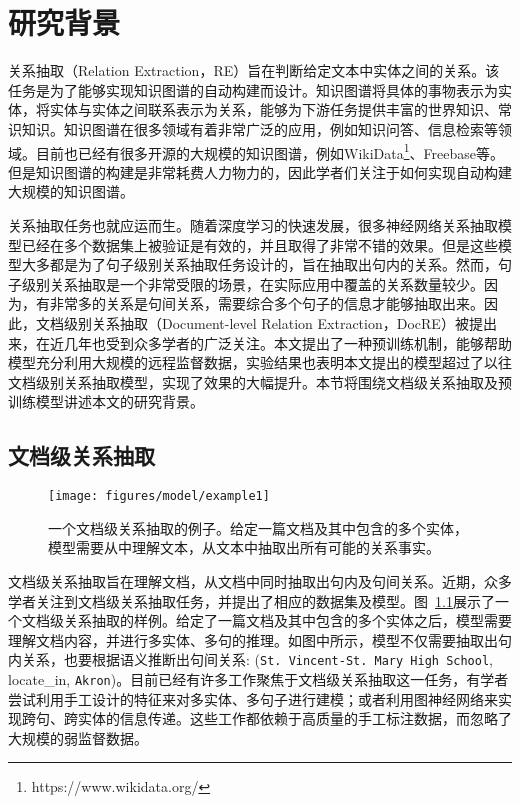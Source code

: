 
\chapter{研究背景}
\label{cha:intro}

关系抽取（Relation Extraction，RE）旨在判断给定文本中实体之间的关系。该任务是为了能够实现知识图谱的自动构建而设计。知识图谱将具体的事物表示为实体，将实体与实体之间联系表示为关系，能够为下游任务提供丰富的世界知识、常识知识。知识图谱在很多领域有着非常广泛的应用，例如知识问答、信息检索等领域。目前也已经有很多开源的大规模的知识图谱，例如WikiData\footnote{https://www.wikidata.org/}、Freebase等。但是知识图谱的构建是非常耗费人力物力的，因此学者们关注于如何实现自动构建大规模的知识图谱。

关系抽取任务也就应运而生。随着深度学习的快速发展，很多神经网络关系抽取模型已经在多个数据集上被验证是有效的，并且取得了非常不错的效果。但是这些模型大多都是为了句子级别关系抽取任务设计的\cite{zeng2014relation,lin2016neural,zeng2015distant}，旨在抽取出句内的关系。然而，句子级别关系抽取是一个非常受限的场景，在实际应用中覆盖的关系数量较少。因为，有非常多的关系是句间关系，需要综合多个句子的信息才能够抽取出来。因此，文档级别关系抽取（Document-level Relation Extraction，DocRE）被提出来，在近几年也受到众多学者的广泛关注。本文提出了一种预训练机制，能够帮助模型充分利用大规模的远程监督数据，实验结果也表明本文提出的模型超过了以往文档级别关系抽取模型，实现了效果的大幅提升。本节将围绕文档级关系抽取及预训练模型讲述本文的研究背景。

\section{文档级关系抽取}

\begin{figure}[ht]
	\centering
	\texttt{[image: figures/model/example1]}
	\caption{一个文档级关系抽取的例子。给定一篇文档及其中包含的多个实体，模型需要从中理解文本，从文本中抽取出所有可能的关系事实。}
	\label{intro:example}
\end{figure}

文档级关系抽取旨在理解文档，从文档中同时抽取出句内及句间关系。近期，众多学者关注到文档级关系抽取任务，并提出了相应的数据集及模型\cite{christopoulou2018walk,sahu2019inter,yao2019docred}。图~\ref{intro:example}展示了一个文档级关系抽取的样例。给定了一篇文档及其中包含的多个实体之后，模型需要理解文档内容，并进行多实体、多句的推理。如图中所示，模型不仅需要抽取出句内关系，也要根据语义推断出句间关系: (\texttt{St. Vincent-St. Mary High School}, locate\_in, \texttt{Akron})。目前已经有许多工作聚焦于文档级关系抽取这一任务，有学者尝试利用手工设计的特征\cite{gu2016chemical,gu2017chemical}来对多实体、多句子进行建模；或者利用图神经网络来实现跨句、跨实体的信息传递\cite{christopoulou2019connecting,sahu2019inter}。这些工作都依赖于高质量的手工标注数据，而忽略了大规模的弱监督数据。

